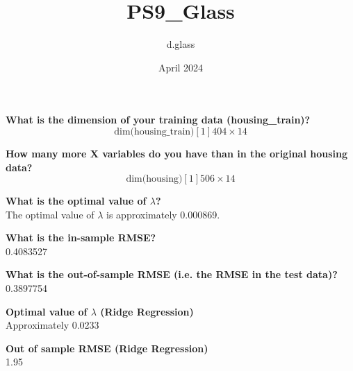 \documentclass{article}
\title{PS9_Glass}
\author{d.glass }
\date{April 2024}
\begin{document}
\maketitle

\textbf{What is the dimension of your training data (housing\_train)?}
\[
\text{dim(housing\_train)} [1] 404 \times 14
\]

\textbf{How many more X variables do you have than in the original housing data?}
\[
\text{dim(housing)} [1] 506 \times 14
\]

\textbf{What is the optimal value of $\lambda$?}\\
The optimal value of $\lambda$ is approximately 0.000869.

\textbf{What is the in-sample RMSE?}\\
0.4083527

\textbf{What is the out-of-sample RMSE (i.e. the RMSE in the test data)?}\\
0.3897754

\textbf{Optimal value of $\lambda$ (Ridge Regression)}\\
Approximately 0.0233

\textbf{Out of sample RMSE (Ridge Regression)}\\
1.95
\end{document}

